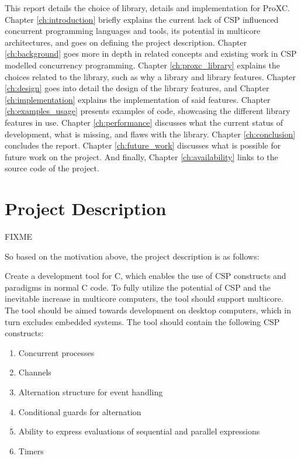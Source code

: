 This report details the choice of library, details and implementation for ProXC. Chapter \ref{ch:introduction} briefly explains the current lack of CSP influenced concurrent programming languages and tools, its potential in multicore architectures, and goes on defining the project description. Chapter \ref{ch:background} goes more in depth in related concepts and existing work in CSP modelled concurrency programming. Chapter \ref{ch:proxc_library} explains the choices related to the library, such as why a library and library features. Chapter \ref{ch:design} goes into detail the design of the library features, and Chapter \ref{ch:implementation} explains the implementation of said features. Chapter \ref{ch:examples_usage} presents examples of code, showcasing the different library features in use. Chapter \ref{ch:performance} discusses what the current status of development, what is missing, and flaws with the library. Chapter \ref{ch:conclusion} concludes the report. Chapter \ref{ch:future_work} discusses what is possible for future work on the project. And finally, Chapter \ref{ch:availability} links to the source code of the project.


\section{Project Description}
\label{sec:project_description}

FIXME

So based on the motivation above, the project description is as follows:

Create a development tool for C, which enables the use of CSP constructs and paradigms in normal C code. To fully utilize the potential of CSP and the inevitable increase in multicore computers, the tool should support multicore. The tool should be aimed towards development on desktop computers, which in turn excludes embedded systems. The tool should contain the following CSP constructs:

\begin{enumerate}
    \item Concurrent processes
    \item Channels
    \item Alternation structure for event handling
    \item Conditional guards for alternation
    \item Ability to express evaluations of sequential and parallel expressions
    \item Timers
\end{enumerate}

